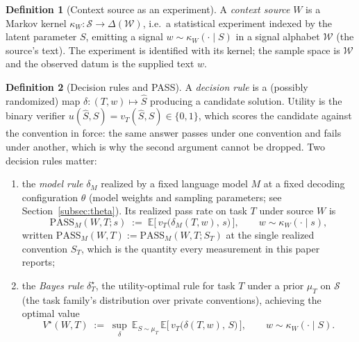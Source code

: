 \documentclass[11pt]{article}
\theoremstyle{plain}
\theoremstyle{definition}
\newtheorem{definition}{Definition}
\theoremstyle{remark}
\newcommand{\PASS}{\mathrm{PASS}}
\newcommand{\Wcal}{\mathcal{W}}
\newcommand{\Scal}{\mathcal{S}}
\begin{document}
\begin{definition}[Context source as an experiment]
\label{def:source}
A \emph{context source} $W$ is a Markov kernel $\kappa_W : \Scal \to \Delta(\Wcal)$,
i.e.\ a statistical experiment indexed by the latent parameter $S$, emitting a signal
$w \sim \kappa_W(\cdot \mid S)$ in a signal alphabet $\Wcal$ (the source's text). The
experiment is identified with its kernel; the sample space is $\Wcal$ and the observed
datum is the supplied text $w$.
\end{definition}

\begin{definition}[Decision rules and PASS]
\label{def:decision}
A \emph{decision rule} is a (possibly randomized) map $\delta : (T,w) \mapsto \widehat S$
producing a candidate solution. Utility is the binary verifier $u(\widehat S, S) = v_T(\widehat S,
S) \in \{0,1\}$, which scores the candidate against the convention in force: the same answer
passes under one convention and fails under another, which is why the second argument cannot be
dropped. Two decision rules matter:
\begin{enumerate}
  \item[(i)] the \emph{model rule} $\delta_M$ realized by a fixed language model $M$ at a fixed
    decoding configuration $\theta$ (model weights and sampling parameters; see
    Section~\ref{subsec:theta}). Its realized pass rate on task $T$ under source $W$ is
    \begin{equation}
    \label{eq:pass}
    \PASS_M(W,T;s) \;:=\; \mathbb E\big[\, v_T\!\big(\delta_M(T,w),\,s\big)\,\big],
    \qquad w \sim \kappa_W(\cdot \mid s),
    \end{equation}
    written $\PASS_M(W,T) := \PASS_M(W,T;S_T)$ at the single realized convention $S_T$, which is
    the quantity every measurement in this paper reports;
  \item[(ii)] the \emph{Bayes rule} $\delta^\star_{T}$, the utility-optimal rule for task $T$
    under a prior $\mu_T$ on $\Scal$ (the task family's distribution over private conventions),
    achieving the optimal value
    \begin{equation}
    \label{eq:vstar}
    V^\star(W,T) \;:=\; \sup_{\delta}\ \mathbb E_{S\sim\mu_T}\,
      \mathbb E\big[\, v_T\!\big(\delta(T,w),\,S\big)\,\big],
    \qquad w \sim \kappa_W(\cdot \mid S).
    \end{equation}
\end{enumerate}
\end{definition}
\end{document}
